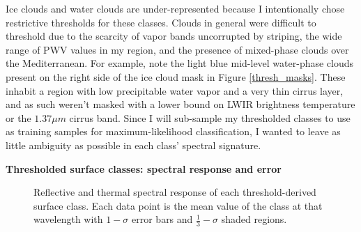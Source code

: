 \documentclass[12pt]{article}
\begin{document}
Ice clouds and water clouds are under-represented because I intentionally chose restrictive thresholds for these classes. Clouds in general were difficult to threshold due to the scarcity of vapor bands uncorrupted by striping, the wide range of PWV values in my region, and the presence of mixed-phase clouds over the Mediterranean. For example, note the light blue mid-level water-phase clouds present on the right side of the ice cloud mask in Figure \ref{thresh_masks}. These inhabit a region with low precipitable water vapor and a very thin cirrus layer, and as such weren't masked with a lower bound on LWIR brightness temperature or the $1.37\mu m$ cirrus band. Since I will sub-sample my thresholded classes to use as training samples for maximum-likelihood classification, I wanted to leave as little ambiguity as possible in each class' spectral signature.

\clearpage

\noindent
\textbf{Thresholded surface classes: spectral response and error}


\begin{figure}[h!]
    \centering

    \begin{center}
    \end{center}

    \caption{Reflective and thermal spectral response of each threshold-derived surface class. Each data point is the mean value of the class at that wavelength with $1-\sigma$ error bars and $\frac{1}{3}-\sigma$ shaded regions.}
    \label{thresh_spectra}
\end{figure}
\end{document}

